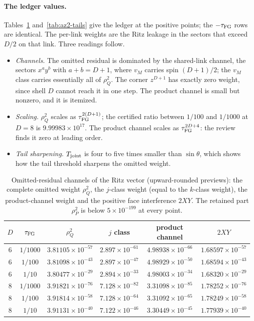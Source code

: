 \paragraph{The ledger values.}
Tables~\ref{tab:az2-channels} and~\ref{tab:az2-tails} give the ledger at the
positive points; the $-\tau_{\mathrm{FG}}$ rows are identical. The per-link weights are the
Ritz leakage in the sectors that exceed $D/2$ on that link. Three readings
follow.
\begin{itemize}
\item \emph{Channels.} The omitted residual is dominated by the shared-link
 channel, the sectors $x^ay^b$ with $a+b=D+1$, where $v_M$ carries spin
 $(D+1)/2$; the $v_M$ class carries essentially all of $\rho_Q^2$. The corner
 $z^{D+1}$ has exactly zero weight, since shell $D$ cannot reach it in one
 step. The product channel is small but nonzero, and it is itemized.
\item \emph{Scaling.} $\rho_Q^2$ scales as $\tau_{\mathrm{FG}}^{2(D+1)}$; the certified ratio
 between $1/100$ and $1/1000$ at $D=8$ is $9.99983\times10^{17}$. The
 product channel scales as $\tau_{\mathrm{FG}}^{2D+4}$: the review finds it zero at leading
 order.
\item \emph{Tail sharpening.} $T_{\rm joint}$ is four to five times smaller
 than $\sin\theta$, which shows how the tail threshold sharpens the omitted
 weight.
\end{itemize}

\begin{table}[htbp]
\centering\small
\caption{Omitted-residual channels of the Ritz vector (upward-rounded
previews): the complete omitted weight $\rho_Q^2$, the $j$-class weight (equal
to the $k$-class weight), the product-channel weight and the positive face
interference $2XY$. The retained part $\rho_P^2$ is below $5\times10^{-199}$
at every point.}
\label{tab:az2-channels}
\begin{tabular}{@{}cccccc@{}}
\toprule
$D$ & $\tau_{\mathrm{FG}}$ & $\rho_Q^2$ & $j$ class & product channel & $2XY$\\
\midrule
6 & $1/1000$ & $3.81105\times10^{-57}$ & $2.897\times10^{-61}$ & $4.98938\times10^{-66}$ & $1.68597\times10^{-57}$\\
6 & $1/100$ & $3.81098\times10^{-43}$ & $2.897\times10^{-47}$ & $4.98929\times10^{-50}$ & $1.68594\times10^{-43}$\\
6 & $1/10$ & $3.80477\times10^{-29}$ & $2.894\times10^{-33}$ & $4.98003\times10^{-34}$ & $1.68320\times10^{-29}$\\[2pt]
8 & $1/1000$ & $3.91821\times10^{-76}$ & $7.128\times10^{-82}$ & $3.31098\times10^{-85}$ & $1.78252\times10^{-76}$\\
8 & $1/100$ & $3.91814\times10^{-58}$ & $7.128\times10^{-64}$ & $3.31092\times10^{-65}$ & $1.78249\times10^{-58}$\\
8 & $1/10$ & $3.91131\times10^{-40}$ & $7.122\times10^{-46}$ & $3.30449\times10^{-45}$ & $1.77939\times10^{-40}$\\
\bottomrule
\end{tabular}
\end{table}

